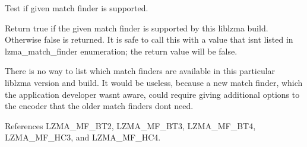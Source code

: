 Test if given match finder is supported. 

Return true if the given match finder is supported by this liblzma build. Otherwise false is returned. It is safe to call this with a value that isn\textquotesingle{}t listed in lzma\+\_\+match\+\_\+finder enumeration; the return value will be false.

There is no way to list which match finders are available in this particular liblzma version and build. It would be useless, because a new match finder, which the application developer wasn\textquotesingle{}t aware, could require giving additional options to the encoder that the older match finders don\textquotesingle{}t need. 

References L\+Z\+M\+A\+\_\+\+M\+F\+\_\+\+B\+T2, L\+Z\+M\+A\+\_\+\+M\+F\+\_\+\+B\+T3, L\+Z\+M\+A\+\_\+\+M\+F\+\_\+\+B\+T4, L\+Z\+M\+A\+\_\+\+M\+F\+\_\+\+H\+C3, and L\+Z\+M\+A\+\_\+\+M\+F\+\_\+\+H\+C4.

